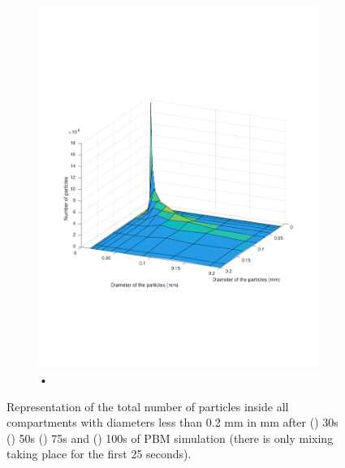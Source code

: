 \documentclass[preprint,11pt,authoryear]{elsarticle}
\begin{document}
\begin{figure}
\begin{subfigure}{.5\textwidth}
\includegraphics[scale=0.45]{rslts-PBM_100s_psd.pdf}
\caption{•}
\label{fig:100s}
\end{subfigure}
\caption{ Representation of the total number of particles inside all compartments with diameters less than 0.2 mm 
in mm after () 30s () 50s () 75s and
 () 100s of PBM simulation (there is only mixing taking place for the first 25 seconds).}
\label{fig:rslts_PBM_d50_plots}
\end{figure}   
\end{document}
